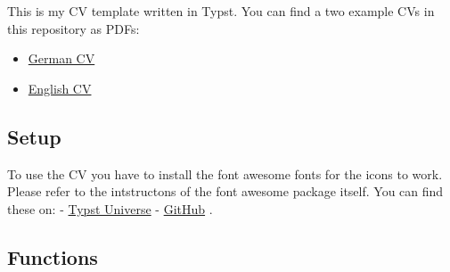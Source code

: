 \label{readme}
This is my CV template written in Typst. You can find a two example CVs
in this repository as PDFs:

\begin{itemize}
\tightlist
\item
  \href{https://github.com/AnsgarLichter/light-cv/blob/main/cv-de.pdf}{German
  CV}
\item
  \href{https://github.com/AnsgarLichter/light-cv/blob/main/cv-en.pdf}{English
  CV}
\end{itemize}

\subsection{Setup}\label{setup}

To use the CV you have to install the font awesome fonts for the icons
to work. Please refer to the intstructons of the font awesome package
itself. You can find these on: -
\href{https://typst.app/universe/package/fontawesome}{Typst Universe} -
\href{https://github.com/duskmoon314/typst-fontawesome}{GitHub} .

\subsection{Functions}\label{functions}

